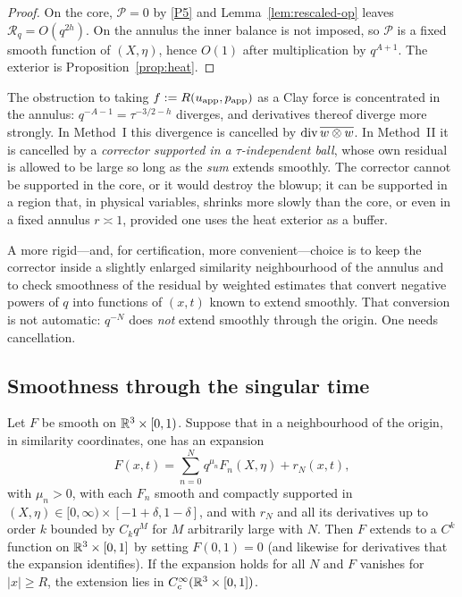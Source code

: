 \begin{proof}
On the core, $\mathcal P=0$ by \ref{P5} and Lemma~\ref{lem:rescaled-op} leaves $\mathcal R_q=O(q^{2h})$. On the annulus the inner balance is not imposed, so $\mathcal P$ is a fixed smooth function of $(X,\eta)$, hence $O(1)$ after multiplication by $q^{A+1}$. The exterior is Proposition~\ref{prop:heat}.
\end{proof}

The obstruction to taking $f:=R(u_{\mathrm{app}},p_{\mathrm{app}})$ as a {C}lay force is concentrated in the annulus: $q^{-A-1}=\tau^{-3/2-h}$ diverges, and derivatives thereof diverge more strongly. In Method~I this divergence is cancelled by $\operatorname{div}\overline{w\otimes w}$. In Method~II it is cancelled by a \emph{corrector supported in a $\tau$-independent ball}, whose own residual is allowed to be large so long as the \emph{sum} extends smoothly. The corrector cannot be supported in the core, or it would destroy the blowup; it can be supported in a region that, in physical variables, shrinks more slowly than the core, or even in a fixed annulus $r\asymp 1$, provided one uses the heat exterior as a buffer.

A more rigid---and, for certification, more convenient---choice is to keep the corrector inside a slightly enlarged similarity neighbourhood of the annulus and to check smoothness of the residual by weighted estimates that convert negative powers of $q$ into functions of $(x,t)$ known to extend smoothly. That conversion is not automatic: $q^{-N}$ does \emph{not} extend smoothly through the origin. One needs cancellation.

\subsection{Smoothness through the singular time}

\begin{lemma}
\label{lem:smooth-ext}
Let $F$ be smooth on $\mathbb{R}^3\times[0,1)$. Suppose that in a neighbourhood of the origin, in similarity coordinates, one has an expansion
\begin{equation}
\label{eq:F-exp}
F(x,t)=\sum_{n=0}^{N} q^{\mu_n} F_n(X,\eta)
+r_N(x,t),
\end{equation}
with $\mu_n>0$, with each $F_n$ smooth and compactly supported in $(X,\eta)\in[0,\infty)\times[-1+\delta,1-\delta]$, and with $r_N$ and all its derivatives up to order $k$ bounded by $C_k q^{M}$ for $M$ arbitrarily large with $N$. Then $F$ extends to a $C^k$ function on $\mathbb{R}^3\times[0,1]$ by setting $F(0,1)=0$ (and likewise for derivatives that the expansion identifies). If the expansion holds for all $N$ and $F$ vanishes for $|x|\ge R$, the extension lies in $C_c^\infty(\mathbb{R}^3\times[0,1])$.
\end{lemma}

